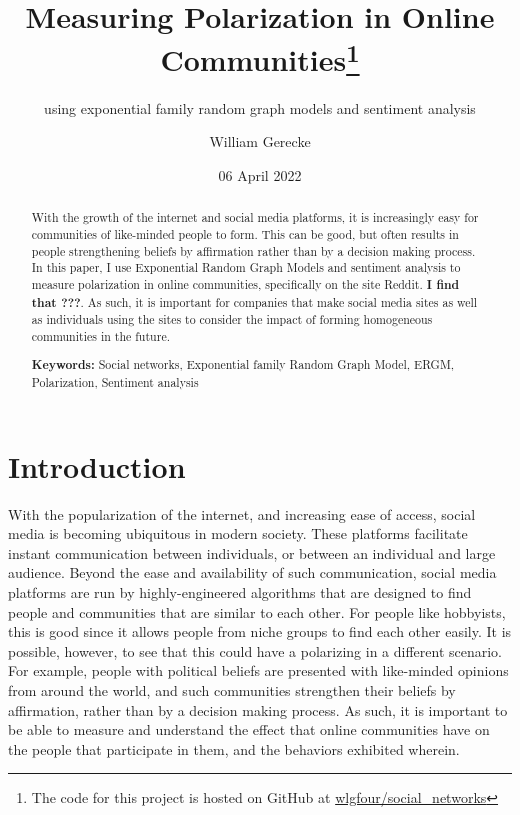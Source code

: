 \documentclass[
]{article}
\title{Measuring Polarization in Online Communities\thanks{The code for this project is hosted on GitHub at \href{https://github.com/wlgfour/social_networks}{wlgfour/social\_networks}}}
\subtitle{using exponential family random graph models and sentiment analysis}
\author{William Gerecke}
\date{06 April 2022}
\begin{document}
\maketitle
\begin{abstract}
With the growth of the internet and social media platforms, it is increasingly easy for communities of like-minded people to form. This can be good, but often results in people strengthening beliefs by affirmation rather than by a decision making process. In this paper, I use Exponential Random Graph Models and sentiment analysis to measure polarization in online communities, specifically on the site Reddit. \textbf{I find that ???}. As such, it is important for companies that make social media sites as well as individuals using the sites to consider the impact of forming homogeneous communities in the future.

\par

\textbf {Keywords:} Social networks, Exponential family Random Graph Model, ERGM, Polarization, Sentiment analysis
\end{abstract}

\newpage
\tableofcontents

\newpage

\hypertarget{introduction}{%
\section{Introduction}\label{introduction}}

With the popularization of the internet, and increasing ease of access, social media is becoming ubiquitous in modern society. These platforms facilitate instant communication between individuals, or between an individual and large audience. Beyond the ease and availability of such communication, social media platforms are run by highly-engineered algorithms that are designed to find people and communities that are similar to each other. For people like hobbyists, this is good since it allows people from niche groups to find each other easily. It is possible, however, to see that this could have a polarizing in a different scenario. For example, people with political beliefs are presented with like-minded opinions from around the world, and such communities strengthen their beliefs by affirmation, rather than by a decision making process. As such, it is important to be able to measure and understand the effect that online communities have on the people that participate in them, and the behaviors exhibited wherein.
\end{document}
